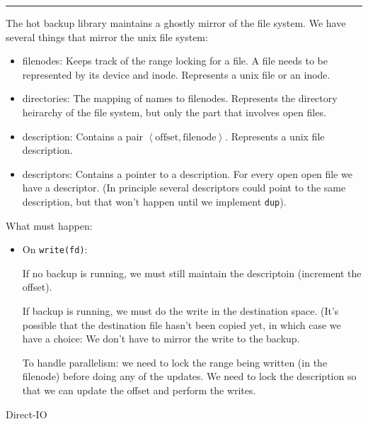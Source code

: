 \documentclass[10pt]{article}
\begin{document}
 \hrule

The hot backup library maintains a ghostly mirror of the file system.  We have several things that mirror the unix file system:
\begin{itemize}
\item filenodes: Keeps track of the range locking for a file.  A file needs to be represented by its device and inode.  Represents a unix file or an inode.
\item directories: The mapping of names to filenodes. Represents the directory heirarchy of the file system, but only the part that involves open files.
\item description: Contains a pair $\left<\mbox{offset},\mbox{filenode}\right>$.  Represents a unix file description.
\item descriptors: Contains a pointer to a description.  For every open open file we have a descriptor.  (In principle several descriptors could point to the same description, but that won't happen until we implement \texttt{dup}).
\end{itemize}

What must happen:
\begin{itemize}
\item On \texttt{write(fd)}: 

 If no backup is running, we must still maintain the descriptoin (increment the offset).

 If backup is running, we must do the write in the destination space.
 (It's possible that the destination file hasn't been copied yet, in
 which case we have a choice: We don't have to mirror the write to the
 backup.

 To handle parallelism: we need to lock the range being written (in the filenode) before doing any of the updates.
  We need to lock the description so that we can update the offset and perform the writes.

\end{itemize}

Direct-IO
\end{document}

